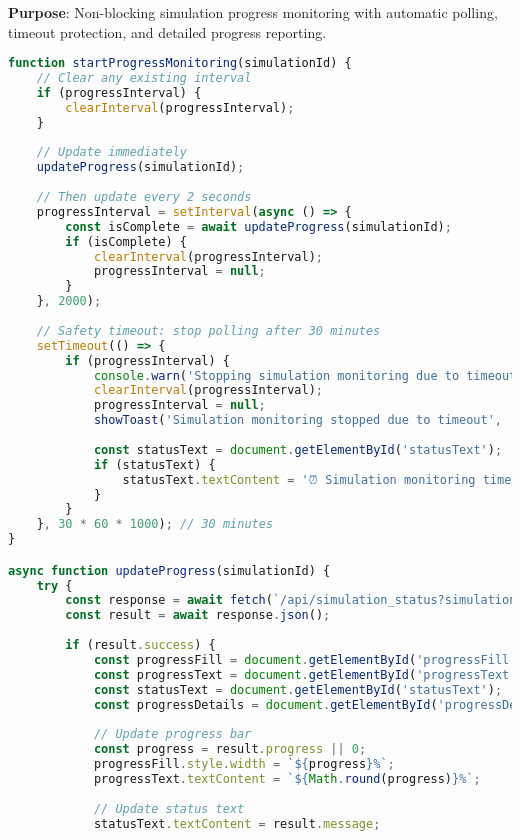 \documentclass[12pt,a4paper]{article}
\begin{document}
\textbf{Purpose}: Non-blocking simulation progress monitoring with automatic polling, timeout protection, and detailed progress reporting.

\begin{lstlisting}[language=JavaScript, caption=Simulation Monitoring System]
function startProgressMonitoring(simulationId) {
    // Clear any existing interval
    if (progressInterval) {
        clearInterval(progressInterval);
    }
    
    // Update immediately
    updateProgress(simulationId);
    
    // Then update every 2 seconds
    progressInterval = setInterval(async () => {
        const isComplete = await updateProgress(simulationId);
        if (isComplete) {
            clearInterval(progressInterval);
            progressInterval = null;
        }
    }, 2000);
    
    // Safety timeout: stop polling after 30 minutes
    setTimeout(() => {
        if (progressInterval) {
            console.warn('Stopping simulation monitoring due to timeout (30 minutes)');
            clearInterval(progressInterval);
            progressInterval = null;
            showToast('Simulation monitoring stopped due to timeout', 'info');
            
            const statusText = document.getElementById('statusText');
            if (statusText) {
                statusText.textContent = '⏰ Simulation monitoring timed out after 30 minutes';
            }
        }
    }, 30 * 60 * 1000); // 30 minutes
}

async function updateProgress(simulationId) {
    try {
        const response = await fetch(`/api/simulation_status?simulation_id=${simulationId}`);
        const result = await response.json();
        
        if (result.success) {
            const progressFill = document.getElementById('progressFill');
            const progressText = document.getElementById('progressText');
            const statusText = document.getElementById('statusText');
            const progressDetails = document.getElementById('progressDetails');
            
            // Update progress bar
            const progress = result.progress || 0;
            progressFill.style.width = `${progress}%`;
            progressText.textContent = `${Math.round(progress)}%`;
            
            // Update status text
            statusText.textContent = result.message;
            

\end{lstlisting}
\end{document}

